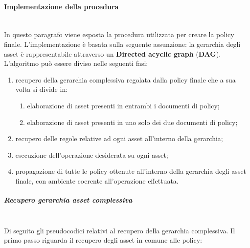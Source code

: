 \documentclass[12pt,a4paper,twoside]{book}
\begin{document}
\paragraph{Implementazione della procedura}\mbox{}\\
In questo paragrafo viene esposta la procedura utilizzata per creare la policy finale. L'implementazione è basata sulla seguente assunzione: la gerarchia degli asset è rappresentabile attraverso un \textbf{Directed acyclic graph} (\textbf{DAG}).
L'algoritmo può essere diviso nelle seguenti fasi:
\begin{enumerate}
	\item recupero della gerarchia complessiva regolata dalla policy finale che a sua volta si divide in:
	\begin{enumerate}
		\item elaborazione di asset presenti in entrambi i documenti di policy;
		\item elaborazione di asset presenti in uno solo dei due documenti di policy;
	\end{enumerate}
	\item recupero delle regole relative ad ogni asset all'interno della gerarchia;
	\item esecuzione dell'operazione desiderata su ogni asset;
	\item propagazione di tutte le policy ottenute all'interno della gerarchia degli asset finale, con ambiente coerente all'operazione effettuata.
\end{enumerate}
\subparagraph{Recupero gerarchia asset complessiva}\mbox{}\\
Di seguito gli pseudocodici relativi al recupero della gerarchia complessiva. Il primo passo riguarda il recupero degli asset in comune alle policy:
\end{document}
